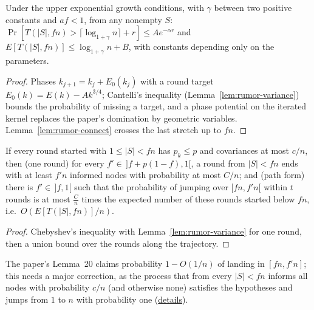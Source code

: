 \begin{theorem}\label{thm:rumor-growth}
\leanok{}
Under the upper exponential growth conditions, with $\gamma$ between two positive constants and
$af<1$, from any nonempty $S$: $\Pr[T(|S|,fn)>\lceil\log_{1+\gamma}n\rceil+r]\le Ae^{-\alpha r}$ and
$E[T(|S|,fn)]\le\log_{1+\gamma}n+B$, with constants depending only on the parameters.
\end{theorem}
\begin{proof}\leanok
Phases $k_{j+1}=k_j+E_0(k_j)$ with a round target $E_0(k)=E(k)-Ak^{3/4}$; Cantelli's inequality
(Lemma~\ref{lem:rumor-variance}) bounds the probability of missing a target, and a phase potential
on the iterated kernel replaces the paper's domination by geometric variables. Lemma~\ref{lem:rumor-connect}
crosses the last stretch up to $fn$.
\end{proof}

\begin{lemma}\label{lem:rumor-jump}
\leanok{}
If every round started with $1\le|S|<fn$ has $p_k\le p$ and covariances at most $c/n$, then
(one round) for every $f'\in\,]f+p(1-f),1[$, a round from $|S|<fn$ ends with at least $f'n$
informed nodes with probability at most $C/n$; and (path form) there is $f'\in\,]f,1[$ such that
the probability of jumping over $[fn,f'n[$ within $t$ rounds is at most $\frac Cn$ times the
expected number of these rounds started below $fn$, i.e.\ $O(E[T(|S|,fn)]/n)$.
\end{lemma}
\begin{proof}\leanok
Chebyshev's inequality with Lemma~\ref{lem:rumor-variance} for one round, then a union bound over
the rounds along the trajectory.
\end{proof}
The paper's Lemma~20 claims probability $1-O(1/n)$ of landing in $[fn,f'n]$; this needs a
major correction, as the process that from every $|S|<fn$ informs all nodes with probability $c/n$ (and otherwise none)
satisfies the hypotheses and jumps from $1$ to $n$ with probability one
(\href{https://github.com/formal-dynamics/leanamics/blob/main/epidemics/FORMALIZATION_DIFFERENCES.md#lemma-20-of-the-paper-needs-a-major-correction}{details}).

